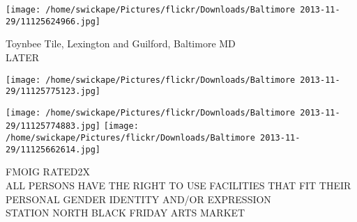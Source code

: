 \documentclass[10pt,letterpaper]{article}
\begin{document}
\vspace{0.25in}
\texttt{[image: /home/swickape/Pictures/flickr/Downloads/Baltimore 2013-11-29/11125624966.jpg]}

Toynbee Tile, Lexington and Guilford, Baltimore MD\\
LATER
\pagebreak

\texttt{[image: /home/swickape/Pictures/flickr/Downloads/Baltimore 2013-11-29/11125775123.jpg]}

\vspace{0.25in}
\texttt{[image: /home/swickape/Pictures/flickr/Downloads/Baltimore 2013-11-29/11125774883.jpg]}
\texttt{[image: /home/swickape/Pictures/flickr/Downloads/Baltimore 2013-11-29/11125662614.jpg]}

FMOIG RATED2X\\
ALL PERSONS HAVE THE RIGHT TO USE FACILITIES THAT FIT THEIR PERSONAL GENDER IDENTITY AND/OR EXPRESSION\\
STATION NORTH BLACK FRIDAY ARTS MARKET
\pagebreak
\end{document}

